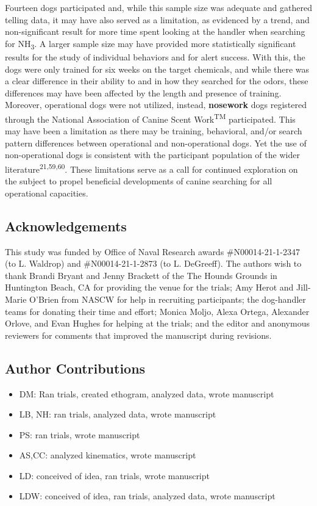 \documentclass[
]{article}
\providecommand{\tightlist}{%
  \setlength{\itemsep}{0pt}\setlength{\parskip}{0pt}}
\begin{document}
Fourteen dogs participated and, while this sample size was adequate and gathered telling data, it may have also served as a limitation, as evidenced by a trend, and non-significant result for more time spent looking at the handler when searching for NH\textsubscript{3}. A larger sample size may have provided more statistically significant results for the study of individual behaviors and for alert success. With this, the dogs were only trained for six weeks on the target chemicals, and while there was a clear difference in their ability to and in how they searched for the odors, these differences may have been affected by the length and presence of training. Moreover, operational dogs were not utilized, instead, \textbf{nosework} dogs registered through the National Association of Canine Scent Work\textsuperscript{TM} participated. This may have been a limitation as there may be training, behavioral, and/or search pattern differences between operational and non-operational dogs. Yet the use of non-operational dogs is consistent with the participant population of the wider literature\textsuperscript{21,59,60}. These limitations serve as a call for continued exploration on the subject to propel beneficial developments of canine searching for all operational capacities.

\hypertarget{acknowledgements}{%
\subsection{Acknowledgements}\label{acknowledgements}}

This study was funded by Office of Naval Research awards \#N00014-21-1-2347 (to L. Waldrop) and \#N00014-21-1-2873 (to L. DeGreeff). The authors wish to thank Brandi Bryant and Jenny Brackett of the The Hounds Grounds in Huntington Beach, CA for providing the venue for the trials; Amy Herot and Jill-Marie O'Brien from NASCW for help in recruiting participants; the dog-handler teams for donating their time and effort; Monica Moljo, Alexa Ortega, Alexander Orlove, and Evan Hughes for helping at the trials; and the editor and anonymous reviewers for comments that improved the manuscript during revisions.

\hypertarget{author-contributions}{%
\subsection{Author Contributions}\label{author-contributions}}

\begin{itemize}
\tightlist
\item
  DM: Ran trials, created ethogram, analyzed data, wrote manuscript
\item
  LB, NH: ran trials, analyzed data, wrote manuscript
\item
  PS: ran trials, wrote manuscript
\item
  AS,CC: analyzed kinematics, wrote manuscript
\item
  LD: conceived of idea, ran trials, wrote manuscript
\item
  LDW: conceived of idea, ran trials, analyzed data, wrote manuscript
\end{itemize}
\end{document}
